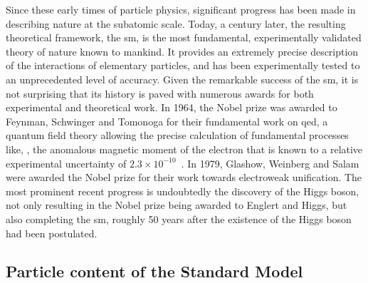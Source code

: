 Since these early times of particle physics, significant progress has been made in describing nature at the subatomic scale.
Today, a century later, the resulting theoretical framework, the \gls{sm}, is the most fundamental, experimentally validated theory of nature known to mankind.
It provides an extremely precise description of the interactions of elementary particles, and has been experimentally tested to an unprecedented level of accuracy. Given the remarkable success of the \gls{sm}, it is not surprising that its history is paved with numerous awards for both experimental and theoretical work.
In 1964, the Nobel prize was awarded to Feynman, Schwinger and Tomonoga for their fundamental work on \gls{qed}, a quantum field theory allowing the precise calculation of fundamental processes like, \eg, the anomalous magnetic moment of the electron that is known to a relative experimental uncertainty of $2.3 \times 10^{-10}$~\cite{Mohr:2015ccw}.
In 1979, Glashow, Weinberg and Salam were awarded the Nobel prize for their work towards electroweak unification.
The most prominent recent progress is undoubtedly the discovery of the Higgs boson, not only resulting in the Nobel prize being awarded to Englert and Higgs, but also completing the \gls{sm}, roughly 50 years after the existence of the Higgs boson had been postulated. 
		
\subsection{Particle content of the Standard Model}

